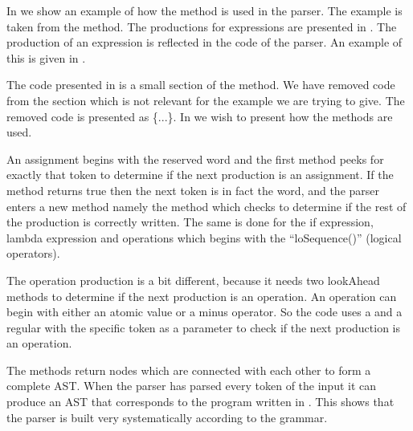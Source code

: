 In  we show an example of how the
 method is used in the parser. The example is taken from
the  method. The productions for expressions are presented
in .
The production of an expression is reflected in the code of the parser. An
example of this is given in .





The code presented in  is a small section of the
 method. We have removed code from the section which is
not relevant for the example we are trying to give. The removed code is
presented as \{...\}. In  we wish to present how
the  methods are used.

An assignment begins with the reserved word  and the first
 method peeks for exactly that token to determine if the
next production is an assignment. If the method returns true then the next token is
in fact the  word, and the parser enters a new method namely the
 method which checks to determine if the rest of the
production is correctly written. The same is done for the if expression, lambda
expression and operations which begins with the ``loSequence()'' (logical operators).

The operation production is a bit different, because it needs two lookAhead
methods to determine if the next production is an operation. An operation can
begin with either an atomic value or a minus operator. So the code uses a
 and a regular  with the
specific token as a parameter to check if the next production is an operation.

The methods return nodes which are connected with each other to form a complete AST.
When the parser has parsed every token of the input it can produce an AST that
corresponds to the program written in \productname{}. This shows that the parser
is built very systematically according to the grammar.
